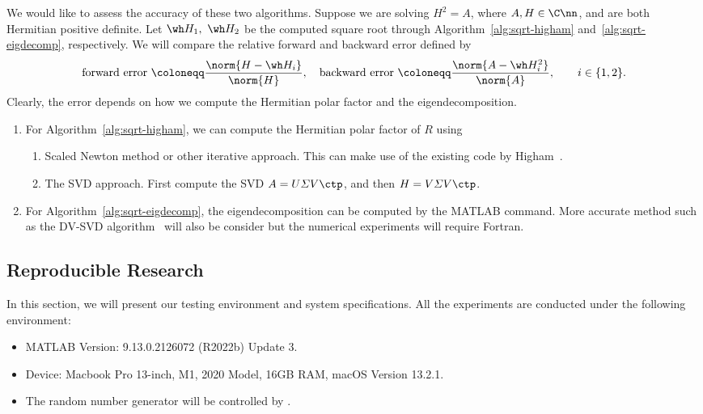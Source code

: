 We would like to assess the accuracy of these two algorithms.
Suppose we are solving $H^{2} = A$, where $A,H\in\C\nn$, and are both
Hermitian positive definite. Let $\wh H_{1},\ \wh H_{2}$ be the computed
square root through Algorithm~\ref{alg:sqrt-higham}
and~\ref{alg:sqrt-eigdecomp}, respectively. We will compare the relative
forward and backward error defined by 
\begin{equation}\label{eq.fwd-bwd-errors}
  \text{forward error }\coloneqq \frac{\norm{H - \wh H_{i}}}{\norm{H}},
  \quad
  \text{backward error }\coloneqq \frac{\norm{A - \wh
  H_{i}^{2}}}{\norm{A}},
  \qquad
  i \in \{1,2\}.
\end{equation}
Clearly, the error depends on how we compute the Hermitian polar factor and
the eigendecomposition.
\begin{enumerate}
\item For Algorithm~\ref{alg:sqrt-higham}, we can compute the Hermitian
polar factor of $R$ using
\begin{enumerate}
\item Scaled Newton method  or other
iterative approach. This can make use of the existing code by
Higham~\cite{high-mft}. 
\item The SVD approach. First compute the SVD $A = U\varSigma V\ctp$, and
then $H = V\varSigma V\ctp$.  
\end{enumerate}
\item For Algorithm~\ref{alg:sqrt-eigdecomp}, the eigendecomposition can be
computed by the MATLAB  command. More accurate method such
as the DV-SVD algorithm~ will also be
consider but the numerical experiments will require Fortran.
\end{enumerate}

\subsection{Reproducible Research}
In this section, we will present our testing environment and system
specifications. All the experiments are conducted under the following
environment:
\begin{itemize}
\item MATLAB Version: 9.13.0.2126072 (R2022b) Update 3.
\item Device: Macbook Pro 13-inch, M1, 2020 Model, 16GB RAM, macOS Version
13.2.1.
\item The random number generator will be controlled by .
\end{itemize}

